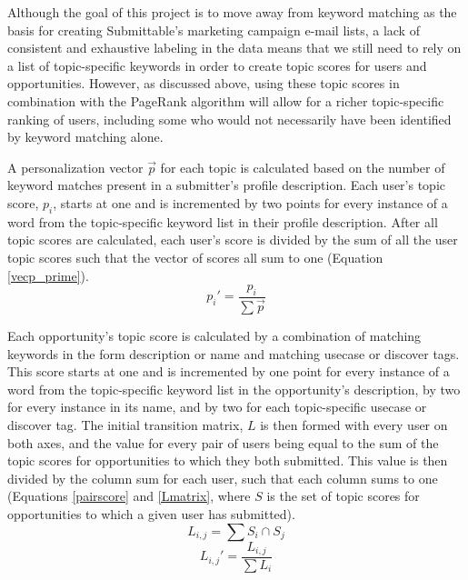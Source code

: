 \documentclass[12pt]{report}   %
\begin{document}
Although the goal of this project is to move away from keyword matching as the basis for creating Submittable's marketing campaign e-mail lists, a lack of consistent and exhaustive labeling in the data means that we still need to rely on a list of topic-specific keywords in order to create topic scores for users and opportunities. However, as discussed above, using these topic scores in combination with the PageRank algorithm will allow for a richer topic-specific ranking of users, including some who would not necessarily have been identified by keyword matching alone.

A personalization vector $\vec{p}$ for each topic is calculated based on the number of keyword matches present in a submitter's profile description. Each user's topic score, $p_{i}$, starts at one and is incremented by two points for every instance of a word from the topic-specific keyword list in their profile description. After all topic scores are calculated, each user's score is divided by the sum of all the user topic scores such that the vector of scores all sum to one (Equation \ref{vecp_prime}).
\begin{equation}
\label{vecp_prime}
p_{i}'=\frac{p_i}{\sum{\vec{p}}}
\end{equation}

Each opportunity's topic score is calculated by a combination of matching keywords in the form description or name and matching usecase or discover tags. This score starts at one and is incremented by one point for every instance of a word from the topic-specific keyword list in the opportunity's description, by two for every instance in its name, and by two for each topic-specific usecase or discover tag. The initial transition matrix, $L$ is then formed with every user on both axes, and the value for every pair of users being equal to the sum of the topic scores for opportunities to which they both submitted. This value is then divided by the column sum for each user, such that each column sums to one (Equations \ref{pairscore} and \ref{Lmatrix}, where $S$ is the set of topic scores for opportunities to which a given user has submitted).
\begin{equation}
\label{pairscore}
L_{i,j}=\sum{S_i\cap S_j}
\end{equation}
\begin{equation}
\label{Lmatrix}
L_{i,j}' =\frac{L_{i,j}}{\sum{L_i}}
\end{equation}
\end{document}
